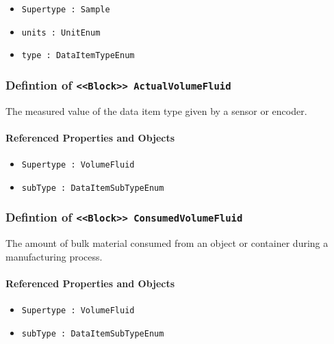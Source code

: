 \begin{itemize}
\item \texttt{Supertype : Sample}

\item \texttt{units : UnitEnum}

\item \texttt{type : DataItemTypeEnum}

\end{itemize}
\FloatBarrier
\subsubsection{Defintion of \texttt{<<Block>> ActualVolumeFluid}}
  \label{type:ActualVolumeFluid}

\FloatBarrier

The measured value of the data item type given by a sensor or encoder.

\FloatBarrier
\paragraph{Referenced Properties and Objects}

\begin{itemize}
\item \texttt{Supertype : VolumeFluid}

\item \texttt{subType : DataItemSubTypeEnum}

\end{itemize}
\FloatBarrier
\subsubsection{Defintion of \texttt{<<Block>> ConsumedVolumeFluid}}
  \label{type:ConsumedVolumeFluid}

\FloatBarrier

The amount of bulk material consumed from an object or container during a manufacturing process.

\FloatBarrier
\paragraph{Referenced Properties and Objects}

\begin{itemize}
\item \texttt{Supertype : VolumeFluid}

\item \texttt{subType : DataItemSubTypeEnum}

\end{itemize}
\FloatBarrier
